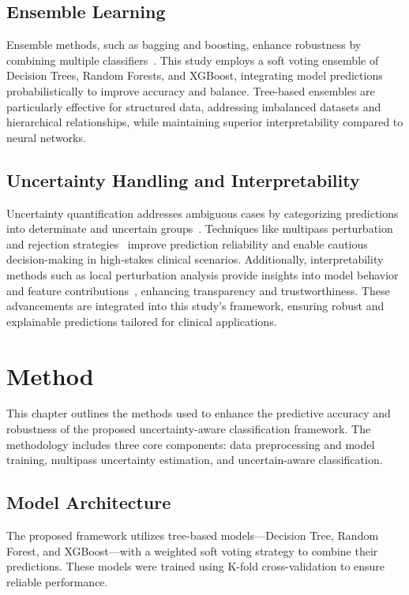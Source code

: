 \documentclass{ieeeaccess}
\begin{document}
\subsection{Ensemble Learning}
Ensemble methods, such as bagging and boosting, enhance robustness by combining multiple classifiers~\cite{9893798}. This study employs a soft voting ensemble of Decision Trees, Random Forests, and XGBoost, integrating model predictions probabilistically to improve accuracy and balance. Tree-based ensembles are particularly effective for structured data, addressing imbalanced datasets and hierarchical relationships, while maintaining superior interpretability compared to neural networks.

\subsection{Uncertainty Handling and Interpretability}
Uncertainty quantification addresses ambiguous cases by categorizing predictions into determinate and uncertain groups~\cite{Uncertainty_Quantification}. Techniques like multipass perturbation and rejection strategies~\cite{electronics11030396} improve prediction reliability and enable cautious decision-making in high-stakes clinical scenarios. Additionally, interpretability methods such as local perturbation analysis provide insights into model behavior and feature contributions~\cite{perturbations}, enhancing transparency and trustworthiness. These advancements are integrated into this study’s framework, ensuring robust and explainable predictions tailored for clinical applications.

\section{Method}
This chapter outlines the methods used to enhance the predictive accuracy and robustness of the proposed uncertainty-aware classification framework. The methodology includes three core components: data preprocessing and model training, multipass uncertainty estimation, and uncertain-aware classification.

\subsection{Model Architecture}
The proposed framework utilizes tree-based models—Decision Tree, Random Forest, and XGBoost—with a weighted soft voting strategy to combine their predictions. These models were trained using K-fold cross-validation to ensure reliable performance.
\end{document}

